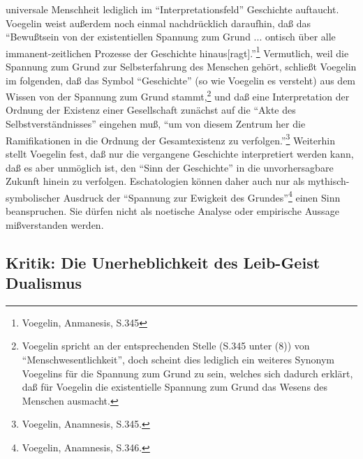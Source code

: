 universale Menschheit lediglich im "`Interpretationsfeld"' Geschichte
auftaucht. Voegelin weist außerdem noch einmal nachdrücklich daraufhin, daß
das "`Bewußtsein von der existentiellen Spannung zum Grund ... ontisch über
alle immanent-zeitlichen Prozesse der Geschichte
hinaus[ragt]."'\footnote{Voegelin, Anmanesis, S.345} Vermutlich, weil die
Spannung zum Grund zur Selbsterfahrung des Menschen gehört, schließt Voegelin
im folgenden, daß das Symbol "`Geschichte"' (so wie Voegelin es versteht) aus
dem Wissen von der Spannung zum Grund stammt,\footnote{Voegelin spricht an der
  entsprechenden Stelle (S.345 unter (8)) von "`Menschwesentlichkeit"', doch
  scheint dies lediglich ein weiteres Synonym Voegelins für die Spannung zum
  Grund zu sein, welches sich dadurch erklärt, daß für Voegelin die
  existentielle Spannung zum Grund das Wesens des Menschen ausmacht.} und daß
eine Interpretation der Ordnung der Existenz einer Gesellschaft zunächst auf
die "`Akte des Selbstverständnisses"' eingehen muß, "`um von diesem Zentrum
her die Ramifikationen in die Ordnung der Gesamtexistenz zu
verfolgen."'\footnote{Voegelin, Anamnesis, S.345.} Weiterhin stellt Voegelin
fest, daß nur die vergangene Geschichte interpretiert werden kann, daß es aber
unmöglich ist, den "`Sinn der Geschichte"' in die unvorhersagbare Zukunft
hinein zu verfolgen. Eschatologien können daher auch nur als
mythisch-symbolischer Ausdruck der "`Spannung zur Ewigkeit des
Grundes"'\footnote{Voegelin, Anamnesis, S.346.} einen Sinn beanspruchen. Sie
dürfen nicht als noetische Analyse oder empirische Aussage mißverstanden
werden.

\subsection{Kritik: Die Unerheblichkeit des Leib-Geist Dualismus}

